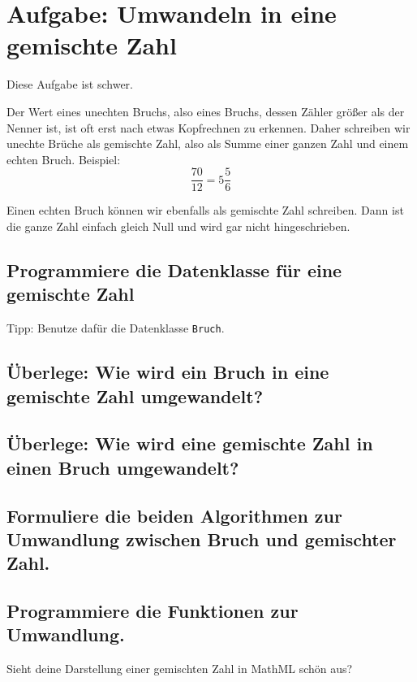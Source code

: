 \section{Aufgabe: Umwandeln in eine gemischte Zahl}

Diese Aufgabe ist schwer.

Der Wert eines unechten Bruchs, also eines Bruchs, dessen Zähler größer als der Nenner ist, ist oft erst nach etwas Kopfrechnen zu erkennen. Daher schreiben wir unechte Brüche als gemischte Zahl, also als Summe einer ganzen Zahl und einem echten Bruch. Beispiel:
\[
\frac{70}{12} = 5 \frac{5}{6}
\]

Einen echten Bruch können wir ebenfalls als gemischte Zahl schreiben. Dann ist die ganze Zahl einfach gleich Null und wird gar nicht hingeschrieben.

\subsection*{Programmiere die Datenklasse für eine gemischte Zahl}

Tipp: Benutze dafür die Datenklasse \texttt{Bruch}.

\subsection*{Überlege: Wie wird ein Bruch in eine gemischte Zahl umgewandelt?}

\subsection*{Überlege: Wie wird eine gemischte Zahl in einen Bruch umgewandelt?}

\subsection*{Formuliere die beiden Algorithmen zur Umwandlung zwischen Bruch und gemischter Zahl.}

\subsection*{Programmiere die Funktionen zur Umwandlung.}

Sieht deine Darstellung einer gemischten Zahl in MathML schön aus?